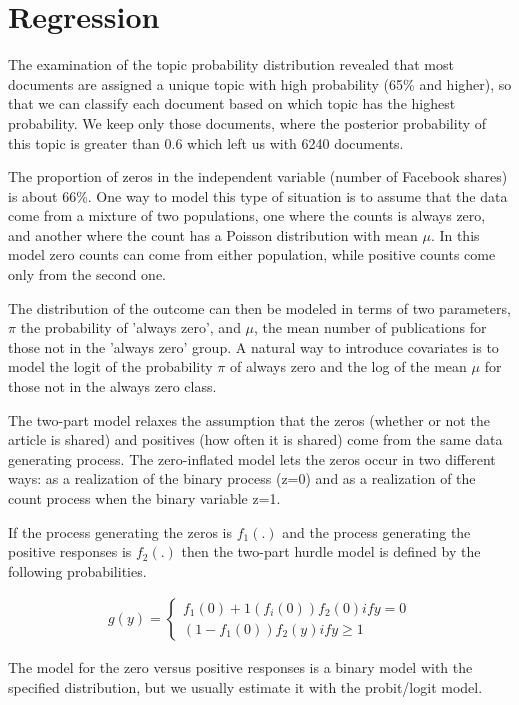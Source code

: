 \documentclass[12pt,a4paper,notitlepage]{article}
\begin{document}

%

\section{Regression}\label{ch_regression}

The examination of the topic probability distribution revealed that most documents are assigned a unique topic with high probability (65\% and higher), so that we can classify each document based on which topic has the highest probability. We keep only those documents, where the posterior probability of this topic is greater than 0.6 which left us with 6240 documents. 

The proportion of zeros in the independent variable (number of Facebook shares) is about 66\%. One way to model this type of situation is to assume that the data come from a mixture of two populations, one where the counts is always zero, and another where the count has a Poisson distribution with mean $\mu$. In this model zero counts can come from either population, while positive counts come only from the second one. 

The distribution of the outcome can then be modeled in terms of two parameters, $\pi$ the probability of 'always zero', and $\mu$, the mean number of publications for those not in the 'always zero' group. A natural way to introduce covariates is to model the logit of the probability $\pi$ of always zero and the log of the mean $\mu$ for those not in the always zero class.

The two-part model relaxes the assumption that the zeros (whether or not the article is shared) and positives (how often it is shared) come from the same data generating process. The zero-inflated model lets the zeros occur in two different ways: as a realization of the binary process (z=0) and as a realization of the count process when the binary variable z=1. 

If the process generating the zeros is $f_1(.)$ and the process generating the positive responses is $f_2(.)$ then the two-part hurdle model is defined by the following probabilities. 

\begin{align*}
	g(y)=\begin{cases}
		f_1(0) + 1(f_i(0))f_2(0) if y=0 \\
		(1-f_1(0))f_2(y) if y\geq 1
	\end{cases}
\end{align*}

The model for the zero versus positive responses is a binary model with the specified distribution, but we usually estimate it with the probit/logit model.
\end{document}
